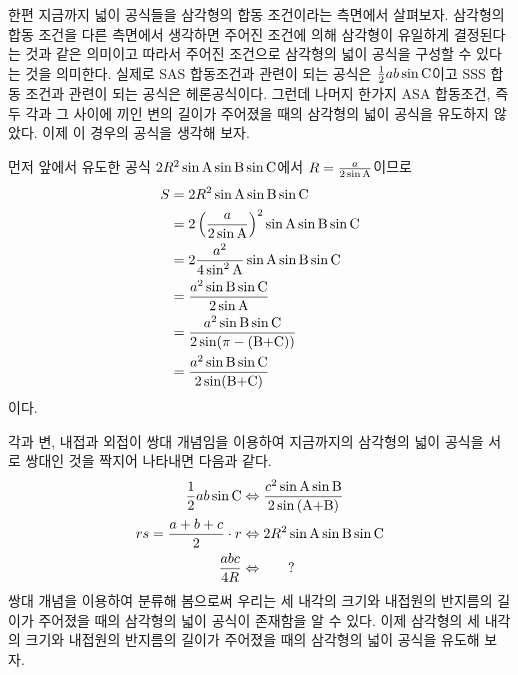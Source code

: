 \documentclass[11pt, a4paper]{book}
\begin{document}
한편 지금까지 넓이 공식들을 삼각형의 합동 조건이라는 측면에서 살펴보자. 삼각형의 합동 조건을 다른 측면에서 생각하면 주어진 조건에 의해 삼각형이 유일하게 결정된다는 것과 같은 의미이고 따라서 주어진 조건으로 삼각형의 넓이 공식을 구성할 수 있다는 것을 의미한다. 실제로 SAS 합동조건과 관련이 되는 공식은 $\frac{1}{2}ab \sin \textrm{C}$이고 SSS 합동 조건과 관련이 되는 공식은 헤론공식이다. 그런데 나머지 한가지 ASA 합동조건, 즉 두 각과 그 사이에 끼인 변의 길이가 주어졌을 때의 삼각형의 넓이 공식을 유도하지 않았다. 이제 이 경우의 공식을 생각해 보자.

먼저 앞에서 유도한 공식 $2R^2 \sin \textrm{A}\sin \textrm{B}\sin \textrm{C}$에서 $R =\frac{a}{2\sin \textrm{A}}$이므로
\begin{align*}
	S & = 2R^2 \sin \textrm{A}\sin \textrm{B}\sin \textrm{C} \\
	& = 2 \left(\frac{a}{2 \sin \textrm{A}}\right)^2 \sin \textrm{A}\sin \textrm{B}\sin \textrm{C} \\
	& = 2 \frac{a^2}{4 \sin^2 \textrm{A}} \sin \textrm{A}\sin \textrm{B}\sin \textrm{C} \\
	& = \frac{a^2 \sin \textrm{B} \sin \textrm{C}}{2 \sin \textrm{A}} \\
	&= \frac{a^2 \sin \textrm{B}\sin \textrm{C}}{2 \sin(\pi -(\textrm{B+C}))} \\
	&= \frac{a^2 \sin \textrm{B}\sin \textrm{C}}{2 \sin(\textrm{B+C})}
\end{align*}
이다.

각과 변, 내접과 외접이 쌍대 개념임을 이용하여 지금까지의 삼각형의 넓이 공식을 서로 쌍대인 것을 짝지어 나타내면 다음과 같다.
\begin{align*}
	\frac{1}{2} a b \sin \textrm{C} &\Leftrightarrow \frac{c^2 \sin \textrm{A} \sin \textrm{B}}{2 \sin \textrm{(A+B)}} \\
	rs =\frac{a+b+c}{2} \cdot r & \Leftrightarrow 2R^2 \sin \textrm{A} \sin \textrm{B} \sin \textrm{C} \\
	\frac{abc}{4R} & \Leftrightarrow  \phantom{text} ? 
\end{align*}
쌍대 개념을 이용하여 분류해 봄으로써 우리는 세 내각의 크기와 내접원의 반지름의 길이가 주어졌을 때의 삼각형의 넓이 공식이 존재함을 알 수 있다. 이제 삼각형의 세 내각의 크기와 내접원의 반지름의 길이가 주어졌을 때의 삼각형의 넓이 공식을 유도해 보자.
\end{document}
